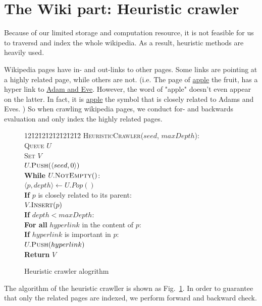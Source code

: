 \documentclass[12pt]{amsart}
\newcommand{\0}{\mat{0}}
\newcommand{\1}{\mathds{1}}
\newenvironment{code}{\begin{tabbing}
    12\=12\=12\=12\=12\=12\=12\=12\= \kill }
  {\end{tabbing}}
\begin{document}
\section{The Wiki part: Heuristic crawler}
\label{sec:wiki}
Because of our limited storage and computation resource, it is not feasible for us to traversd and index the whole wikipedia. As a result, heuristic methods are heavily used.

Wikipedia pages have in- and out-links to other pages. Some links are pointing at a highly related page, while others are not. (i.e. The page of \href{https://en.wikipedia.org/wiki/Apple}{apple} the fruit, has a hyper link to \href{https://en.wikipedia.org/wiki/Adam_and_Eve}{Adam and Eve}. However, the word of "apple" doesn't even appear on the latter. In fact, it is \href{https://en.wikipedia.org/wiki/Apple_(symbolism)}{apple} the symbol that is closely related to Adams and Eves. ) So when crawling wikipedia pages, we conduct for- and backwards evaluation and only index the highly related pages. 

\begin{figure}[htb]
\begin{code}
\textsc{HeuristicCrawler}($seed$, $maxDepth$): \\
\> \textsc{Queue} $U$ \\
\> \textsc{Set} $V$ \\
\> $U.\textsc{Push}(\langle seed, 0 \rangle)$ \\
\> \textbf{While} $U.\textsc{NotEmpty}()$: \\
\>\> $ \langle p, depth \rangle \leftarrow U.Pop()$ \\
\>\> \textbf{If} $p$ is closely related to its parent: \\
\>\>\> $V.\textsc{Insert}(p)$ \\
\>\> \textbf{If} $depth < maxDepth$: \\
\>\>\> \textbf{For all} $hyperlink$ in the content of $p$: \\
\>\>\>\> \textbf{If} $hyperlink$ is important in $p$: \\
\>\>\>\>\> $U.\textsc{Push}(hyperlink)$\\ 
\> \textbf{Return} $V$
\end{code}
\caption{Heuristic crawler alogrithm}
\label{al:crawler}
\end{figure}

The algorithm of the heuristic crawller is shown as Fig.~\ref{al:crawler}. In order to guarantee that only the related pages are indexed, we perform forward and backward check. 
\end{document}
